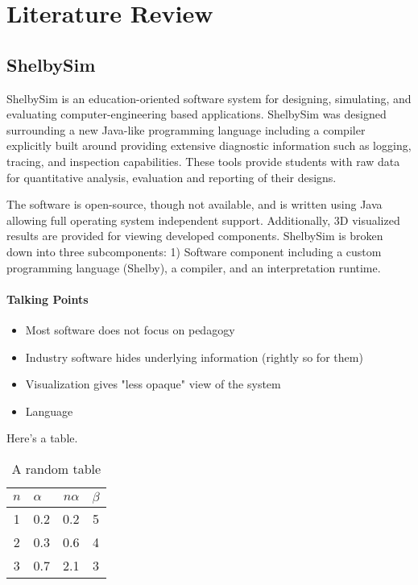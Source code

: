 \chapter{Literature Review}

\section{ShelbySim \cite{Tappan2009}}

ShelbySim is an education-oriented software system for designing, simulating, and evaluating computer-engineering based applications. ShelbySim was designed surrounding a new Java-like programming language including a compiler explicitly built around providing extensive diagnostic information such as logging, tracing, and inspection capabilities. These tools provide students with raw data for quantitative analysis, evaluation and reporting of their designs. 

The software is open-source, though not available, and is written using Java allowing full operating system independent support. Additionally, 3D visualized results are provided for viewing developed components. ShelbySim is broken down into three subcomponents: 1) Software component including a custom programming language (Shelby), a compiler, and an interpretation runtime. 

\subsubsection{Talking Points}

\begin{itemize}
\item Most software does not focus on pedagogy
\item Industry software hides underlying information (rightly so for them)
\item Visualization gives "less opaque" view of the system
\item Language 
\end{itemize}

\lipsum



Here's a table.
\begin{table}[ht]
\begin{center}
\begin{tabular}[ht]{|c|lr|c|} 
\hline
$n$ & $\alpha$ &$n\alpha$ & $\beta$\\
\hline
1 & 0.2 & 0.2 & 5\\
\hline
2 & 0.3 & 0.6 & 4\\
\hline
3 & 0.7 & 2.1 & 3\\
\hline
\end{tabular}
\caption{A random table \label{tab1}}
\end{center}
\end{table}

